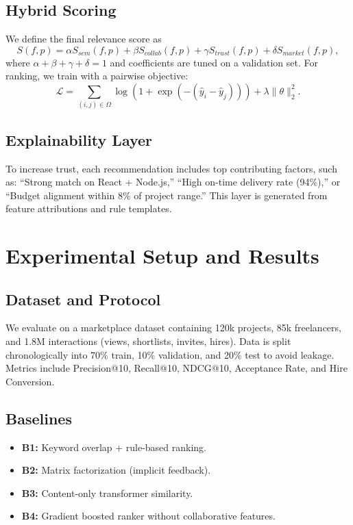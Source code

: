 \documentclass[conference]{IEEEtran}
\begin{document}
\subsection{Hybrid Scoring}
We define the final relevance score as
\begin{equation}
S(f,p)=\alpha S_{sem}(f,p)+\beta S_{collab}(f,p)+\gamma S_{trust}(f,p)+\delta S_{market}(f,p),
\end{equation}
where $\alpha+\beta+\gamma+\delta=1$ and coefficients are tuned on a validation set. For ranking, we train with a pairwise objective:
\begin{equation}
\mathcal{L}=\sum_{(i,j)\in\Omega}\log\left(1+\exp\left(-(\hat{y}_i-\hat{y}_j)\right)\right)+\lambda\|\theta\|_2^2.
\end{equation}

\subsection{Explainability Layer}
To increase trust, each recommendation includes top contributing factors, such as: ``Strong match on React + Node.js,'' ``High on-time delivery rate (94\%),'' or ``Budget alignment within 8\% of project range.'' This layer is generated from feature attributions and rule templates.

\section{Experimental Setup and Results}
\subsection{Dataset and Protocol}
We evaluate on a marketplace dataset containing 120k projects, 85k freelancers, and 1.8M interactions (views, shortlists, invites, hires). Data is split chronologically into 70\% train, 10\% validation, and 20\% test to avoid leakage. Metrics include Precision@10, Recall@10, NDCG@10, Acceptance Rate, and Hire Conversion.

\subsection{Baselines}
\begin{itemize}
\item \textbf{B1:} Keyword overlap + rule-based ranking.
\item \textbf{B2:} Matrix factorization (implicit feedback).
\item \textbf{B3:} Content-only transformer similarity.
\item \textbf{B4:} Gradient boosted ranker without collaborative features.
\end{itemize}
\end{document}

